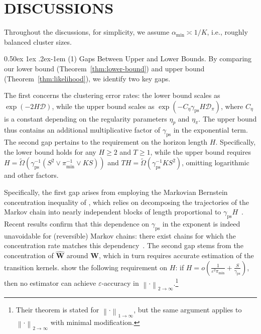 \documentclass[twoside]{article}
\makeatletter
\renewcommand{\paragraph}{%
  \@startsection{paragraph}{4}%
  {\z@}{0.50ex \@plus 1ex \@minus .2ex}{-1em}%
  {\normalfont\normalsize\bfseries}%
}
\def\mW{{\bm{W}}}
\def\gD{{\mathcal{D}}}
\theoremstyle{plain}
\def\bignorm#1{\left\lVert #1 \right\rVert}
\newcommand{\ps}{\mathrm{ps}}
\makeatother
\begin{document}
\section{DISCUSSIONS}
\label{sec:discussions}

Throughout the discussions, for simplicity, we assume $\alpha_{\min} \asymp 1/K$, i.e., roughly balanced cluster sizes.


\paragraph{(1) Gaps Between Upper and Lower Bounds.}
By comparing our lower bound (Theorem~\ref{thm:lower-bound}) and upper bound (Theorem~\ref{thm:likelihood}), we identify two key gaps. 

The first concerns the clustering error rates: the lower bound scales as $\exp(- 2 H \gD)$, while the upper bound scales as $\exp(- C_\eta \gamma_\ps H \gD_\pi)$, where $C_\eta$ is a constant depending on the regularity parameters $\eta_p$ and $\eta_\pi$. The upper bound thus contains an additional multiplicative factor of $\gamma_\ps$ in the exponential term.
The second gap pertains to the requirement on the horizon length $H$. Specifically, the lower bound holds for any $H \geq 2$ and $T \geq 1$, while the upper bound requires $H = \widetilde{\Omega}( \gamma_\ps^{-1} (S^2 \vee \pi_{\min}^{-1} \vee K S) )$ and $TH = \widetilde{\Omega}( \gamma_\ps^{-1} K S^2 )$, omitting logarithmic and other factors.

Specifically, the first gap arises from employing the Markovian Bernstein concentration inequality of \citet{paulin2015markov}, which relies on decomposing  the trajectories of the Markov chain into nearly independent blocks of length proportional to $\gamma_\ps H$~\citep{yu1994blocking,janson2004dependent,lezaud1998chernoff}. Recent results confirm that this dependence on $\gamma_\ps$ in the exponent is indeed unavoidable for (reversible) Markov chains: there exist chains for which the concentration rate matches this dependency~\citep{fan2018bernstein,fan2021hoeffding,rabinovich2020concentration}.
The second gap stems from the concentration of $\widehat{\mW}$ around $\mW$, which in turn requires accurate estimation of the transition kernels. \citet[Theorem 3.2]{wolfer2021markov} show the following requirement on $H$: if $H = o\left( \frac{1}{\varepsilon^2 \pi_{\min}} + \frac{S}{\gamma_\ps} \right)$, then no estimator can achieve $\varepsilon$-accuracy in $\bignorm{\cdot}_{2 \rightarrow \infty}$.\footnote{Their theorem is stated for $\bignorm{\cdot}_{1 \rightarrow \infty}$, but the same argument applies to $\bignorm{\cdot}_{2 \rightarrow \infty}$ with minimal modification.}
\end{document}
